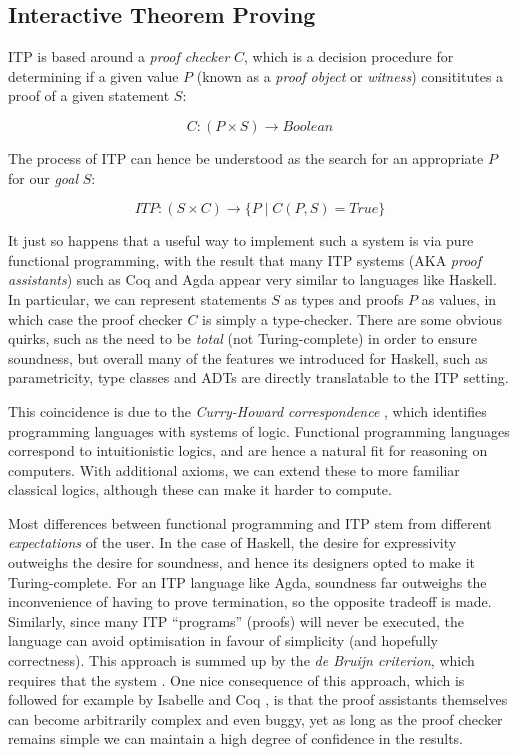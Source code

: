 \documentclass[]{article}
\begin{document}
\subsection{Interactive Theorem Proving}
\label{itp}

ITP is based around a \emph{proof checker} $C$, which is a decision procedure for determining if a given value $P$ (known as a \emph{proof object} or \emph{witness}) consititutes a proof of a given statement $S$:

$$ C \colon (P \times S) \rightarrow Boolean $$

The process of ITP can hence be understood as the search for an appropriate $P$ for our \emph{goal} $S$:

$$ ITP \colon (S \times C) \rightarrow \{ P \mid C(P, S) = True \} $$

It just so happens that a useful way to implement such a system is via pure functional programming, with the result that many ITP systems (AKA \emph{proof assistants}) such as Coq and Agda appear very similar to languages like Haskell. In particular, we can represent statements $S$ as types and proofs $P$ as values, in which case the proof checker $C$ is simply a type-checker. There are some obvious quirks, such as the need to be \emph{total} (not Turing-complete) in order to ensure soundness, but overall many of the features we introduced for Haskell, such as parametricity, type classes and ADTs are directly translatable to the ITP setting.

This coincidence is due to the \emph{Curry-Howard correspondence} \cite{wadler2015propositions}, which identifies programming languages with systems of logic. Functional programming languages correspond to intuitionistic logics, and are hence a natural fit for reasoning on computers. With additional axioms, we can extend these to more familiar classical logics, although these can make it harder to compute.

Most differences between functional programming and ITP stem from different \emph{expectations} of the user. In the case of Haskell, the desire for expressivity outweighs the desire for soundness, and hence its designers opted to make it Turing-complete. For an ITP language like Agda, soundness far outweighs the inconvenience of having to prove termination, so the opposite tradeoff is made. Similarly, since many ITP ``programs'' (proofs) will never be executed, the language can avoid optimisation in favour of simplicity (and hopefully correctness). This approach is summed up by the \emph{de Bruijn criterion}, which requires that the system  \cite[\S~2]{barendregt2001proof}. One nice consequence of this approach, which is followed for example by Isabelle \cite{nipkow2002isabelle} and Coq \cite{bertot2013interactive}, is that the proof assistants themselves can become arbitrarily complex and even buggy, yet as long as the proof checker remains simple we can maintain a high degree of confidence in the results.
\end{document}
